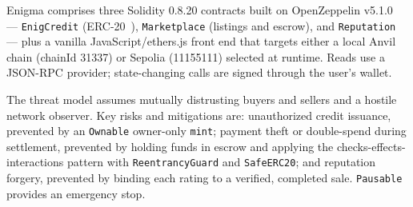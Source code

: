 Enigma comprises three Solidity 0.8.20 contracts built on OpenZeppelin v5.1.0~\cite{openzeppelin} --- \texttt{EnigCredit} (ERC-20~\cite{eip20}), \texttt{Marketplace} (listings and escrow), and \texttt{Reputation} --- plus a vanilla JavaScript/ethers.js front end that targets either a local Anvil chain (chainId 31337) or Sepolia (11155111) selected at runtime. Reads use a JSON-RPC provider; state-changing calls are signed through the user's wallet.

The threat model assumes mutually distrusting buyers and sellers and a hostile network observer. Key risks and mitigations are: unauthorized credit issuance, prevented by an \texttt{Ownable} owner-only \texttt{mint}; payment theft or double-spend during settlement, prevented by holding funds in escrow and applying the checks-effects-interactions pattern with \texttt{ReentrancyGuard} and \texttt{SafeERC20}; and reputation forgery, prevented by binding each rating to a verified, completed sale. \texttt{Pausable} provides an emergency stop.
